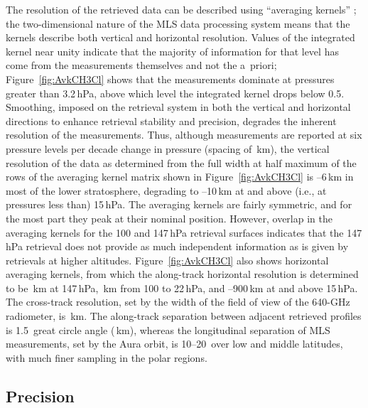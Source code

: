 The resolution of the retrieved data can be described using ``averaging kernels'' \citep[e.g.,][]{Rodgers:2000}; the two-dimensional nature of the MLS data processing system means that the kernels describe both vertical and horizontal resolution. Values of the integrated kernel near unity indicate that the majority of information for that level has come from the measurements themselves and not the a~priori; Figure~\ref{fig:AvkCH3Cl} shows that the measurements dominate at pressures greater than 3.2\,hPa, above which level the integrated kernel drops below 0.5. Smoothing, imposed on the retrieval system in both the vertical and horizontal directions to enhance retrieval stability and precision, degrades the inherent resolution of the measurements. Thus, although  measurements are reported at six pressure levels per decade change in pressure (spacing of \,km), the vertical resolution of the \thisv {} data as determined from the full width at half maximum of the rows of the averaging kernel matrix shown in Figure~\ref{fig:AvkCH3Cl} is --6\,km in most of the lower stratosphere, degrading to --10\,km at and above (i.e., at pressures less than) 15\,hPa. The averaging kernels are fairly symmetric, and for the most part they peak at their nominal position. However, overlap in the averaging kernels for the 100 and 147\,hPa retrieval surfaces indicates that the 147\,hPa retrieval does not provide as much independent information as is given by retrievals at higher altitudes. Figure~\ref{fig:AvkCH3Cl} also shows horizontal averaging kernels, from which the along-track horizontal resolution is determined to be \,km at 147\,hPa, \,km from 100 to 22\,hPa, and --900\,km at and above 15\,hPa. The cross-track resolution, set by the width of the field of view of the \mbox{640\nobreakdash-GHz} radiometer, is \,km. The along-track separation between adjacent retrieved profiles is 1.5\degsym\ great circle angle (\,km), whereas the longitudinal separation of MLS measurements, set by the Aura orbit, is 10\degsym--20\degsym\ over low and middle latitudes, with much finer sampling in the polar regions.

\subsection{Precision}

